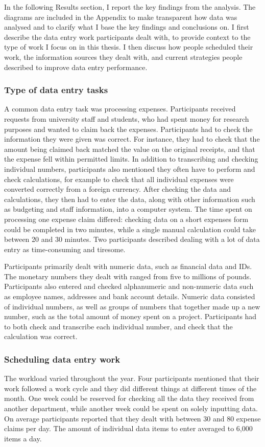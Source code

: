 In the following Results section, I report the key findings from the analysis.  The diagrams are included in the Appendix to make transparent how data was analysed and to clarify what I base the key findings and conclusions on. I first describe the data entry work participants dealt with, to provide context to the type of work I focus on in this thesis. I then discuss how people scheduled their work, the information sources they dealt with, and current strategies people described to improve data entry performance.

\subsubsection{Type of data entry tasks}
A common data entry task was processing expenses. Participants received requests from university staff and students, who had spent money for research purposes and wanted to claim back the expenses. Participants had to check the information they were given was correct. For instance, they had to check that the amount being claimed back matched the value on the original receipts, and that the expense fell within permitted limits. In addition to transcribing and checking individual numbers, participants also mentioned they often have to perform and check calculations, for example to check that all individual expenses were converted correctly from a foreign currency. After checking the data and calculations, they then had to enter the data, along with other information such as budgeting and staff information, into a computer system. The time spent on processing one expense claim differed: checking data on a short expenses form could be completed in two minutes, while a single manual calculation could take between 20 and 30 minutes. Two participants described dealing with a lot of data entry as time-consuming and tiresome.

Participants primarily dealt with numeric data, such as financial data and IDs. The monetary numbers they dealt with ranged from five to millions of pounds. Participants also entered and checked alphanumeric and non-numeric data such as employee names, addresses and bank account details. Numeric data consisted of individual numbers, as well as groups of numbers that together made up a new number, such as the total amount of money spent on a project. Participants had to both check and transcribe each individual number, and check that the calculation was correct. 

\subsubsection{Scheduling data entry work}
The workload varied throughout the year. Four participants mentioned that their work followed a work cycle and they did different things at different times of the month. One week could be reserved for checking all the data they received from another department, while another week could be spent on solely inputting data. On average participants reported that they dealt with between 30 and 80 expense claims per day. The amount of individual data items to enter averaged to 6,000 items a day. 

